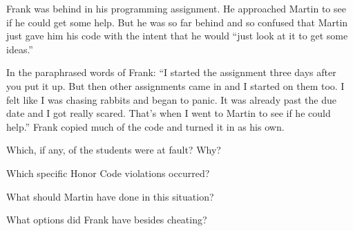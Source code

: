 
Frank was behind in his programming assignment.
He approached Martin to see if he could get some help.
But he was so far behind and so confused that Martin just gave him his code with the intent that he would ``just look at it to get some ideas.''

\vspace{1em}

In the paraphrased words of Frank: ``I started the assignment three days after you put it up.
But then other assignments came in and I started on them too.
I felt like I was chasing rabbits and began to panic.
It was already past the due date and I got really scared.
That's when I went to Martin to see if he could help.''
Frank copied much of the code and turned it in as his own.



\Q Which, if any, of the students were at fault? Why?

\begin{answer}
\end{answer}


\Q Which specific Honor Code violations occurred?

\begin{answer}
\end{answer}


\Q What should Martin have done in this situation?

\begin{answer}
\end{answer}


\Q What options did Frank have besides cheating?

\begin{answer}
\end{answer}
